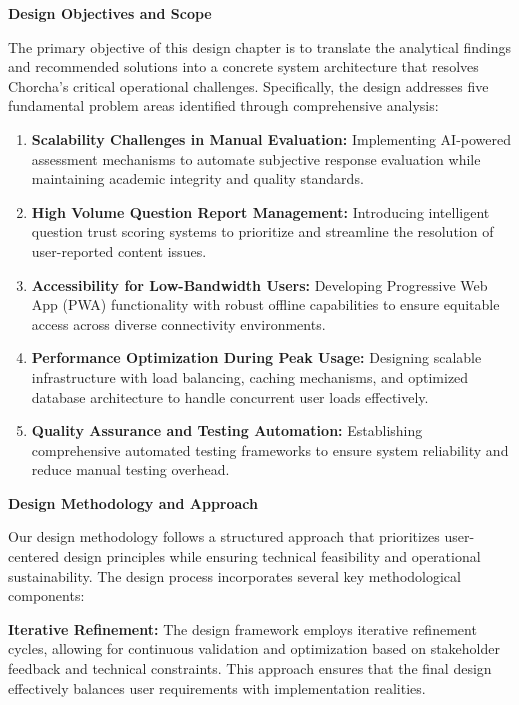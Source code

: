 \documentclass[12pt,a4paper,oneside]{book}
\begin{document}
\textbf{Design Objectives and Scope}

The primary objective of this design chapter is to translate the analytical findings and recommended solutions into a concrete system architecture that resolves Chorcha's critical operational challenges. Specifically, the design addresses five fundamental problem areas identified through comprehensive analysis:

\begin{enumerate}
    \item \textbf{Scalability Challenges in Manual Evaluation:} Implementing AI-powered assessment mechanisms to automate subjective response evaluation while maintaining academic integrity and quality standards.
    
    \item \textbf{High Volume Question Report Management:} Introducing intelligent question trust scoring systems to prioritize and streamline the resolution of user-reported content issues.
    
    \item \textbf{Accessibility for Low-Bandwidth Users:} Developing Progressive Web App (PWA) functionality with robust offline capabilities to ensure equitable access across diverse connectivity environments.
    
    \item \textbf{Performance Optimization During Peak Usage:} Designing scalable infrastructure with load balancing, caching mechanisms, and optimized database architecture to handle concurrent user loads effectively.
    
    \item \textbf{Quality Assurance and Testing Automation:} Establishing comprehensive automated testing frameworks to ensure system reliability and reduce manual testing overhead.
\end{enumerate}

\textbf{Design Methodology and Approach}

Our design methodology follows a structured approach that prioritizes user-centered design principles while ensuring technical feasibility and operational sustainability. The design process incorporates several key methodological components:

\textbf{Iterative Refinement:} The design framework employs iterative refinement cycles, allowing for continuous validation and optimization based on stakeholder feedback and technical constraints. This approach ensures that the final design effectively balances user requirements with implementation realities.
\end{document}
